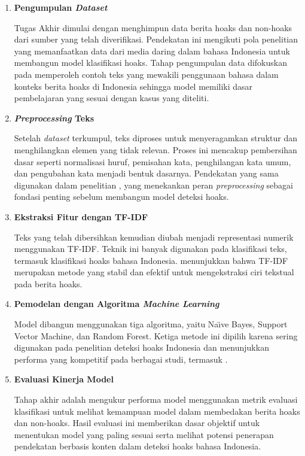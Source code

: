 \begin{enumerate}
    \item \textbf{Pengumpulan \textit{Dataset}}  
    
	Tugas Akhir dimulai dengan menghimpun data berita hoaks dan non-hoaks dari sumber yang telah diverifikasi. Pendekatan ini mengikuti pola penelitian \textcite{pratiwi2022hoax} yang memanfaatkan data dari media daring dalam bahasa Indonesia untuk membangun model klasifikasi hoaks. Tahap pengumpulan data difokuskan pada memperoleh contoh teks yang mewakili penggunaan bahasa dalam konteks berita hoaks di Indonesia sehingga model memiliki dasar pembelajaran yang sesuai dengan kasus yang diteliti.\\

    \item \textbf{\textit{Preprocessing} Teks}  
    
	Setelah \textit{dataset} terkumpul, teks diproses untuk menyeragamkan struktur dan menghilangkan elemen yang tidak relevan. Proses ini mencakup pembersihan dasar seperti normalisasi huruf, pemisahan kata, penghilangan kata umum, dan pengubahan kata menjadi bentuk dasarnya. Pendekatan yang sama digunakan dalam penelitian \textcite{sihombing2020article}, yang menekankan peran \textit{preprocessing} sebagai fondasi penting sebelum membangun model deteksi hoaks.\\

    \item \textbf{Ekstraksi Fitur dengan TF-IDF}  
    
	Teks yang telah dibersihkan kemudian diubah menjadi representasi numerik menggunakan TF-IDF. Teknik ini banyak digunakan pada klasifikasi teks, termasuk klasifikasi hoaks bahasa Indonesia. \textcite{prasetyo2019evaluation} menunjukkan bahwa TF-IDF merupakan metode yang stabil dan efektif untuk mengekstraksi ciri tekstual pada berita hoaks.\\

    \item \textbf{Pemodelan dengan Algoritma \textit{Machine Learning}}  
    
	Model dibangun menggunakan tiga algoritma, yaitu Na\"\i ve Bayes, Support Vector Machine, dan Random Forest. Ketiga metode ini dipilih karena sering digunakan pada penelitian deteksi hoaks Indonesia dan menunjukkan performa yang kompetitif pada berbagai studi, termasuk \textcite{triyono2023indonesian}.\\

    \item \textbf{Evaluasi Kinerja Model}  
    
	Tahap akhir adalah mengukur performa model menggunakan metrik evaluasi klasifikasi untuk melihat kemampuan model dalam membedakan berita hoaks dan non-hoaks. Hasil evaluasi ini memberikan dasar objektif untuk menentukan model yang paling sesuai serta melihat potensi penerapan pendekatan berbasis konten dalam deteksi hoaks bahasa Indonesia.
\end{enumerate}



